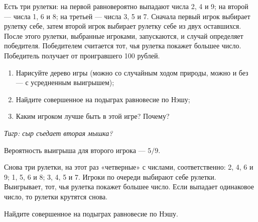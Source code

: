 \begin{problem}[Рулетки {[О]}]\par
\begin{source} \cite{binmore:fg} \end{source}
Есть три рулетки: на первой равновероятно выпадают числа 2, 4 и 9; на второй — числа 1, 6 и 8; на третьей — числа 3, 5 и 7. Сначала первый игрок выбирает рулетку себе, затем второй игрок выбирает рулетку себе из двух оставшихся. После этого рулетки, выбранные игроками, запускаются, и случай определяет победителя. Победителем считается тот, чья рулетка покажет большее число. Победитель получает от проигравшего 100 рублей.\par
\begin{enumerate}
\item Нарисуйте дерево игры (можно со случайным ходом природы, можно и без — с усредненным выигрышем);
\item Найдите совершенное на подыграх равновесие по Нэшу;
\item Каким игроком лучше быть в этой игре? Почему?
\end{enumerate}
{\it Тигр: сыр съедает вторая мышка?}



\begin{sol}
Вероятность выигрыша для второго игрока — $5/9$.
\end{sol}
\end{problem}



\begin{problem}[Рулетки]\par
\begin{source} \cite{binmore:fg} \end{source}
Снова три рулетки, на этот раз «четверные» с числами, соответственно: 2, 4, 6 и 9; 1, 5, 6 и 8; 3, 4, 5 и 7. Игроки по очереди выбирают себе рулетки. Выигрывает, тот, чья рулетка покажет большее число. Если выпадает одинаковое число, то рулетки крутятся снова.\par
Найдите совершенное на подыграх равновесие по Нэшу.

\begin{sol}

\end{sol}
\end{problem}



